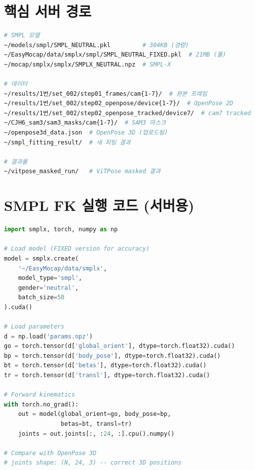 \documentclass[11pt, a4paper]{report}
\begin{document}
\section{핵심 서버 경로}

\begin{lstlisting}[language=bash, numbers=none]
# SMPL 모델
~/models/smpl/SMPL_NEUTRAL.pkl         # 304KB (경량)
~/EasyMocap/data/smplx/smpl/SMPL_NEUTRAL_FIXED.pkl  # 21MB (풀)
~/mocap/smplx/smplx/SMPLX_NEUTRAL.npz  # SMPL-X

# 데이터
~/results/1번/set_002/step01_frames/cam{1-7}/  # 원본 프레임
~/results/1번/set_002/step02_openpose/device{1-7}/  # OpenPose 2D
~/results/1번/set_002/step02_openpose_tracked/device7/  # cam7 tracked
~/CJH6_sam3/sam3_masks/cam{1-7}/  # SAM3 마스크
~/openpose3d_data.json  # OpenPose 3D (업로드됨)
~/smpl_fitting_result/  # 새 피팅 결과

# 결과물
~/vitpose_masked_run/   # ViTPose masked 결과
\end{lstlisting}


\section{SMPL FK 실행 코드 (서버용)}

\begin{lstlisting}[language=Python, caption={서버에서 SMPL 파라미터 $\rightarrow$ 관절 위치 추출}]
import smplx, torch, numpy as np

# Load model (FIXED version for accuracy)
model = smplx.create(
    '~/EasyMocap/data/smplx',
    model_type='smpl',
    gender='neutral',
    batch_size=50
).cuda()

# Load parameters
d = np.load('params.npz')
go = torch.tensor(d['global_orient'], dtype=torch.float32).cuda()
bp = torch.tensor(d['body_pose'], dtype=torch.float32).cuda()
bt = torch.tensor(d['betas'], dtype=torch.float32).cuda()
tr = torch.tensor(d['transl'], dtype=torch.float32).cuda()

# Forward kinematics
with torch.no_grad():
    out = model(global_orient=go, body_pose=bp,
                betas=bt, transl=tr)
    joints = out.joints[:, :24, :].cpu().numpy()

# Compare with OpenPose 3D
# joints shape: (N, 24, 3) -- correct 3D positions
\end{lstlisting}
\end{document}
